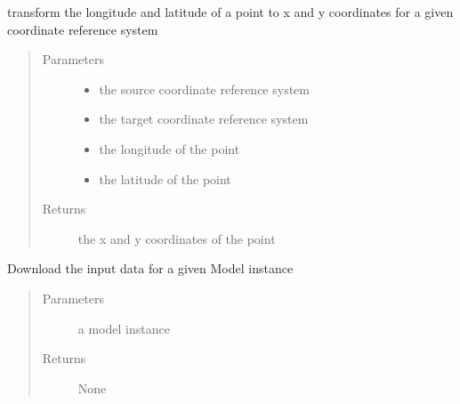 \documentclass[letterpaper,10pt,english]{sphinxmanual}
\begin{document}
\begin{fulllineitems}
\label{\detokenize{octapy:octapy.tracking.transform}}
\sphinxAtStartPar
transform the longitude and latitude of a point to x and y coordinates
for a given coordinate reference system
\begin{quote}\begin{description}
\item[{Parameters}] \leavevmode\begin{itemize}
\item {} 
\sphinxAtStartPar
{} \textendash{} the source coordinate reference system

\item {} 
\sphinxAtStartPar
{} \textendash{} the target coordinate reference system

\item {} 
\sphinxAtStartPar
{} \textendash{} the longitude of the point

\item {} 
\sphinxAtStartPar
{} \textendash{} the latitude of the point

\end{itemize}

\item[{Returns}] \leavevmode
\sphinxAtStartPar
the x and y coordinates of the point

\end{description}\end{quote}

\end{fulllineitems}


\begin{fulllineitems}
\label{\detokenize{octapy:octapy.tracking.download_hycom_data}}
\sphinxAtStartPar
Download the input data for a given Model instance
\begin{quote}\begin{description}
\item[{Parameters}] \leavevmode
\sphinxAtStartPar
{} \textendash{} a model instance

\item[{Returns}] \leavevmode
\sphinxAtStartPar
None

\end{description}\end{quote}

\end{fulllineitems}
\end{document}
